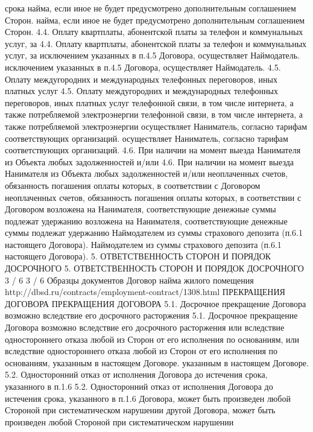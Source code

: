 срока
найма, если иное не будет предусмотрено дополнительным соглашением Сторон.
найма, если иное не будет предусмотрено дополнительным соглашением Сторон.
4.4. Оплату квартплаты, абонентской платы за телефон и коммунальных услуг, за
4.4. Оплату квартплаты, абонентской платы за телефон и коммунальных услуг, за
исключением указанных в п.4.5 Договора, осуществляет Наймодатель.
исключением указанных в п.4.5 Договора, осуществляет Наймодатель.
4.5. Оплату междугородних и международных телефонных переговоров, иных платных
услуг
4.5. Оплату междугородних и международных телефонных переговоров, иных платных
услуг
телефонной связи, в том числе интернета, а также потребляемой электроэнергии
телефонной связи, в том числе интернета, а также потребляемой электроэнергии
осуществляет Наниматель, согласно тарифам соответствующих организаций.
осуществляет Наниматель, согласно тарифам соответствующих организаций.
4.6. При наличии на момент выезда Нанимателя из Объекта любых задолженностей
и/или
4.6. При наличии на момент выезда Нанимателя из Объекта любых задолженностей
и/или
неоплаченных счетов, обязанность погашения оплаты которых, в соответствии с
Договором
неоплаченных счетов, обязанность погашения оплаты которых, в соответствии с
Договором
возложена на Нанимателя, соответствующие денежные суммы подлежат удержанию
возложена на Нанимателя, соответствующие денежные суммы подлежат удержанию
Наймодателем из суммы страхового депозита (п.6.1 настоящего Договора).
Наймодателем из суммы страхового депозита (п.6.1 настоящего Договора).
5. ОТВЕТСТВЕННОСТЬ СТОРОН И ПОРЯДОК ДОСРОЧНОГО
5. ОТВЕТСТВЕННОСТЬ СТОРОН И ПОРЯДОК ДОСРОЧНОГО
                                                3 / 6
                                                3 / 6
Образцы документов
Договор найма жилого помещения
http://dbsd.ru/contracts/employment-contract/1308.html
ПРЕКРАЩЕНИЯ ДОГОВОРА
ПРЕКРАЩЕНИЯ ДОГОВОРА
5.1. Досрочное прекращение Договора возможно вследствие его досрочного
расторжения
5.1. Досрочное прекращение Договора возможно вследствие его досрочного
расторжения
или вследствие одностороннего отказа любой из Сторон от его исполнения по
основаниям,
или вследствие одностороннего отказа любой из Сторон от его исполнения по
основаниям,
указанным в настоящем Договоре.
указанным в настоящем Договоре.
5.2. Односторонний отказ от исполнения Договора до истечения срока, указанного в
п.1.6
5.2. Односторонний отказ от исполнения Договора до истечения срока, указанного в
п.1.6
Договора, может быть произведен любой Стороной при систематическом нарушении
другой
Договора, может быть произведен любой Стороной при систематическом нарушении
